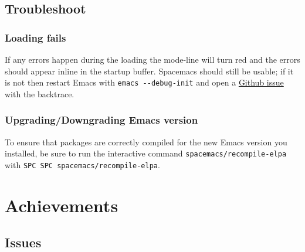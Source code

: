 \documentclass[11pt]{article}
\begin{document}
\subsection{Troubleshoot}
\label{sec:org9db871f}
\subsubsection{Loading fails}
\label{sec:org6b15d3d}
If any errors happen during the loading the mode-line will turn red and the
errors should appear inline in the startup buffer. Spacemacs should still be
usable; if it is not then restart Emacs with \texttt{emacs -{}-debug-init} and open a
\href{https://github.com/syl20bnr/spacemacs/issues}{Github issue} with the backtrace.

\subsubsection{Upgrading/Downgrading Emacs version}
\label{sec:org55e51ea}
To ensure that packages are correctly compiled for the new Emacs version you
installed, be sure to run the interactive command \texttt{spacemacs/recompile-elpa}
with \texttt{SPC SPC spacemacs/recompile-elpa}.

\section{Achievements}
\label{sec:orgc4ce4d2}
\subsection{Issues}
\label{sec:orgf864ccc}
\end{document}
